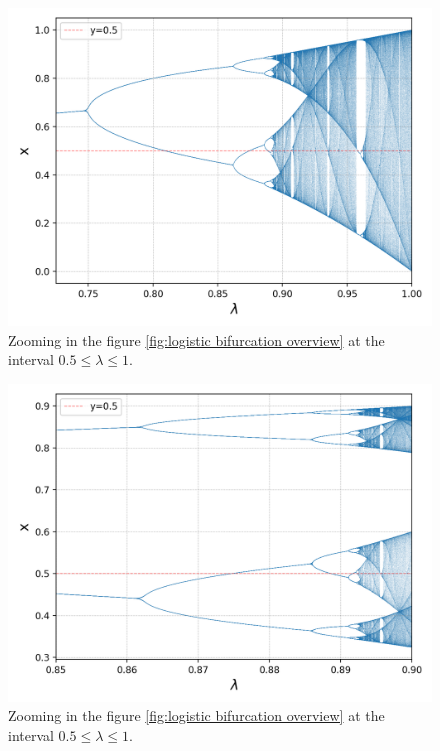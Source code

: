 \documentclass{report}
\theoremstyle{definition}
\theoremstyle{definition}
\theoremstyle{remark}
\begin{document}
\begin{figure}[htbp]
	\centering
	\label{fig:logistic_bifurcation_zoom_1}
	\includegraphics[width=\textwidth]{./figures/l_bifurcation_zoom_1.png}
	\caption{Zooming in the figure \ref{fig:logistic bifurcation overview} at the interval $0.5 \leq \lambda \leq 1$.}
\end{figure}

\begin{figure}[htbp]
	\centering
	\label{fig:logistic_bifurcation_zoom_2}
	\includegraphics[width=\textwidth]{./figures/l_bifurcation_zoom_2.png}
	\caption{Zooming in the figure \ref{fig:logistic bifurcation overview} at the interval $0.5 \leq \lambda \leq 1$.}
\end{figure}
\end{document}
